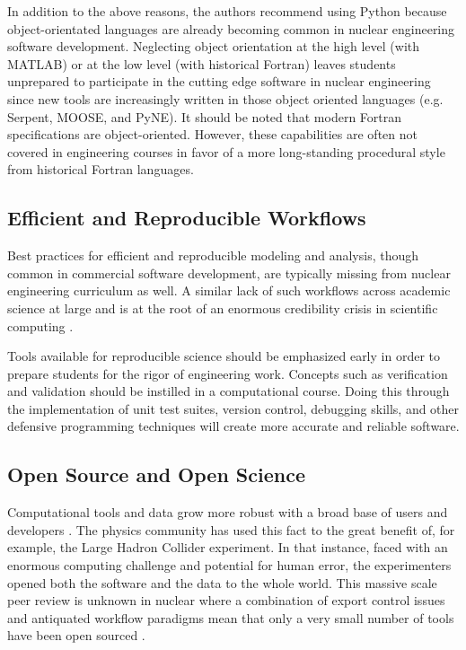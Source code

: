 \documentclass{anstrans}
\begin{document}
In addition to the above reasons, the authors recommend using Python
because object-orientated languages are already becoming common in nuclear
engineering software development.  Neglecting object orientation at the high
level (with MATLAB) or at the low level (with historical Fortran) leaves students
unprepared to participate in the cutting edge software in nuclear engineering 
since new tools are increasingly written in those object oriented languages (e.g.
Serpent\cite{leppanen_serpentcontinuous-energy_2013}, 
MOOSE\cite{gaston_moose:_2009}, and
PyNE\cite{scopatz_pyne:_2012}). It should be noted that modern Fortran specifications 
are object-oriented.  However, these capabilities are often not covered in 
engineering courses in favor of a more long-standing procedural style from historical
Fortran languages.

\subsection{Efficient and Reproducible Workflows}

Best practices for efficient and reproducible modeling and analysis, though
common in commercial software development, are typically missing from nuclear
engineering curriculum as well. A similar lack of such workflows across
academic science at large and is  at the root of an enormous credibility
crisis in scientific computing \cite{donoho_reproducible_2009,
stodden_scientific_2010}.

Tools available for reproducible science should be emphasized early in order to
prepare students for the rigor of engineering work. Concepts such as
verification and validation should be instilled in a computational course.
Doing this through the implementation of unit test suites, version control,
debugging skills, and other defensive programming techniques will create
more accurate and reliable software.

\subsection{Open Source and Open Science}

Computational tools and data grow more robust with a broad base of users and
developers \cite{petre_code_2014, wicherts_willingness_2011}. The physics
community has used this fact to the great benefit of, for example, the Large
Hadron Collider experiment. In that instance, faced with an enormous computing
challenge and potential for human error, the experimenters opened both the
software and the data to the whole world. This massive scale peer review is
unknown in nuclear where a combination of export control issues and antiquated
workflow paradigms mean that only a very small number of tools have been open
sourced \cite{gaston_moose:_2009}\cite{scopatz_pyne:_2012}\cite{carlsen_cyclus_2014}.
\end{document}

